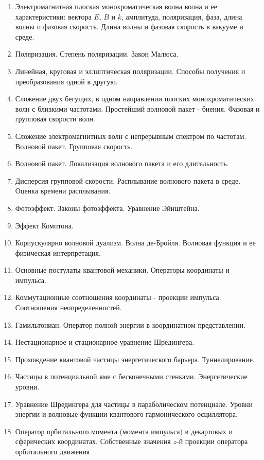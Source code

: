 \documentclass[12pt]{article}
\begin{document}
\begin{enumerate}
    \item Электромагнитная плоская монохроматическая волна волна и ее характеристики: вектора $E$, 
$B$ и $k$, амплитуда, поляризация, фаза, длина волны и фазовая скорость. Длина волны и 
фазовая скорость в вакууме и среде. 
    \item Поляризация. Степень поляризации. Закон Малюса. 
    \item Линейная, круговая и эллиптическая поляризации. Способы получения и преобразования 
одной в другую.  
    \item Сложение двух бегущих, в одном направлении плоских монохроматических волн с близкими 
частотами. Простейший волновой пакет - биения. Фазовая и групповая скорости волн.  
    \item Сложение электромагнитных волн с непрерывным спектром по частотам. Волновой пакет. 
Групповая скорость.  
    \item Волновой пакет. Локализация волнового пакета и его длительность. 
    \item Дисперсия групповой скорости. Расплывание волнового пакета в среде. Оценка времени 
расплывания.  
    \item Фотоэффект. Законы фотоэффекта. Уравнение Эйнштейна. 
    \item Эффект Комптона. 
    \item Корпускулярно волновой дуализм. Волна де-Бройля. Волновая функция и ее физическая 
интерпретация.  
    \item Основные постулаты квантовой механики. Операторы координаты и импульса.  
    \item Коммутационные соотношения координаты - проекции импульса. Соотношения 
неопределенностей.  
    \item Гамильтониан. Оператор полной энергии в координатном представлении.  
    \item Нестационарное и стационарное уравнение Шредингера.  
    \item Прохождение квантовой частицы энергетического барьера. Туннелирование.  
    \item Частицы в потенциальной яме с бесконечными стенками. Энергетические уровни. 
    \item Уравнение Шредингера для частицы в параболическом потенциале. Уровни энергии и 
волновые функции квантового гармонического осциллятора.  
    \item Оператор орбитального момента (момента импульса) в декартовых и сферических 
координатах. Собственные значения $z$-й проекции оператора орбитального движения 

\end{enumerate}
\end{document}
